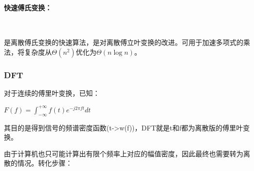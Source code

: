 \documentclass[UTF8]{article}%
\begin{document}
\paragraph{快速傅氏变换：}~{}

是离散傅氏变换的快速算法，是对离散傅立叶变换的改进。可用于加速多项式的乘法，将复杂度从$\varTheta(n^2)$优化为$\varTheta(n \log n)$。

\subsubsection{DFT}

对于连续的傅里叶变换，已知：

$F(f)=\int_{-\infty}^{+\infty} f(t) e^{-j 2 \pi f t} d t$

其目的是得到信号的频谱密度函数(t->w(f))，DFT就是t和f都为离散版的傅里叶变换。

由于计算机也只可能计算出有限个频率上对应的幅值密度，因此最终也需要转为离散的情况。转化步骤：
\end{document}
